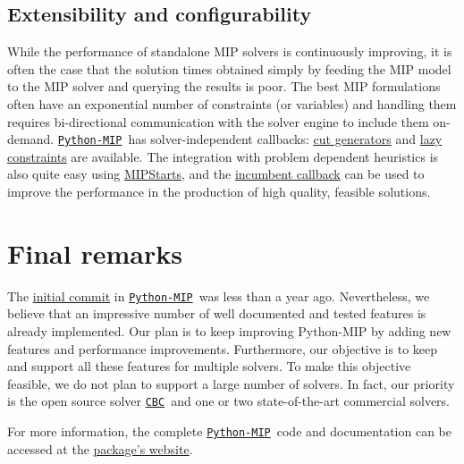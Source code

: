 \documentclass{article}
\def\CBC{\href{https://github.com/coin-or/cbc}{\texttt{CBC}}}
\def\PythonMIP{\href{https://github.com/coin-or/python-mip}{\texttt{Python-MIP}}}
\begin{document}
\subsection{Extensibility and configurability}

While the performance of standalone MIP solvers is continuously improving, it is often the case that the solution times obtained simply by feeding the MIP model to the MIP solver and querying the results is poor. 
The best MIP formulations often have an exponential number of constraints (or variables) and handling them requires bi-directional communication with the solver engine to include them on-demand. %
\PythonMIP\ has solver-independent callbacks: \href{https://python-mip.readthedocs.io/en/latest/custom.html#cut-callback}{cut generators} and \href{https://python-mip.readthedocs.io/en/latest/custom.html#lazy-constraints}{lazy constraints} are available. The integration with problem dependent heuristics is also quite easy using \href{https://python-mip.readthedocs.io/en/latest/custom.html#providing-initial-feasible-solutions}{MIPStarts}, and the \href{https://python-mip.readthedocs.io/en/latest/classes.html#incumbentupdater}{incumbent callback} can be used to improve the performance in the production of high quality, feasible solutions.

\section{Final remarks}

The \href{https://github.com/coin-or/python-mip/commit/ba1719db4bf033dd661844bc797779a98a884d81}{initial commit} in \PythonMIP\ was less than a year ago. 
Nevertheless, we believe that an impressive number of well documented and tested features is already implemented. 
Our plan is to keep improving Python-MIP by adding new features and performance improvements. 
Furthermore, our objective is to keep and support all these features for multiple solvers. 
To make this objective feasible, we do not plan to support a large number of solvers.
In fact, our priority is the open source solver \CBC\ and one or two state-of-the-art commercial solvers. 

For more information, the complete \PythonMIP\ code and documentation can be accessed at the \href{http://www.python-mip.com}{package's website}.



\end{document}
